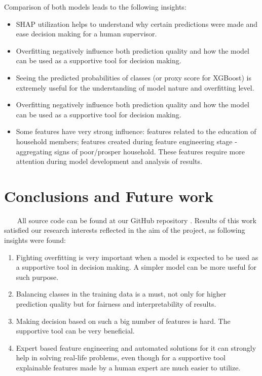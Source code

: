         Comparison of both models leads to the following insights:
        \begin{itemize}
            \item SHAP utilization helps to understand why certain predictions were made and ease decision making for a human supervisor.
            \item Overfitting negatively influence both prediction quality and how the model can be used as a supportive tool for decision making.
            \item Seeing the predicted probabilities of classes (or proxy score for XGBoost) is extremely useful for the understanding of model nature and overfitting level.
            \item Overfitting negatively influence both prediction quality and how the model can be used as a supportive tool for decision making.
            \item Some features have very strong influence: features related to the education of household members; features created during feature engineering stage - aggregating signs of poor/prosper household. These features require more attention during model development and analysis of results.
        \end{itemize}
        
\section{Conclusions and Future work}~~~
    All source code can be found at our GitHub repository \cite{our_github}. Results of this work satisfied our research interests reflected in the aim of the project, as following insights were found:
    \begin{enumerate}
        \item Fighting overfitting is very important when a model is expected to be used as a supportive tool in decision making. A simpler model can be more useful for such purpose.
        \item Balancing classes in the training data is a must, not only for higher prediction quality but for fairness and interpretability of results.
        \item Making decision based on such a big number of features is hard. The supportive tool can be very beneficial. 
        \item Expert based feature engineering and automated solutions for it can strongly help in solving real-life problems, even though for a supportive tool explainable features made by a human expert are much easier to utilize.
    \end{enumerate}
    
